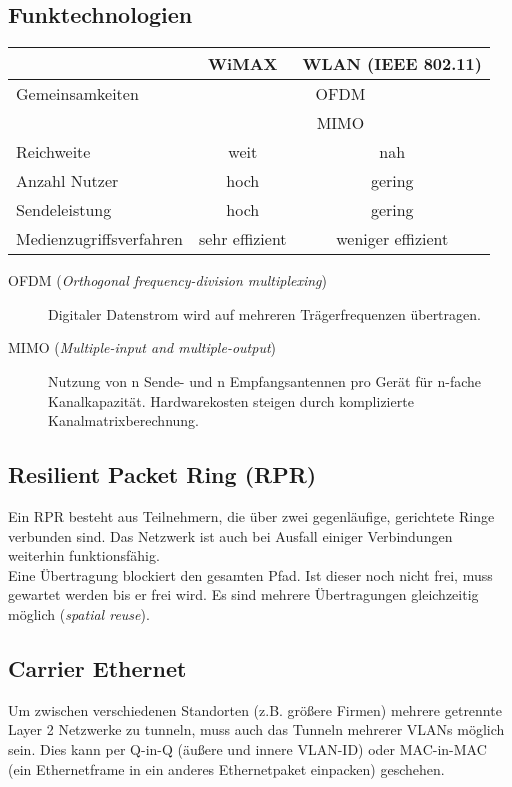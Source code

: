 \documentclass[a4paper]{article}
\begin{document}
\subsection{Funktechnologien}
\begin{tabular}{l|c|c}
    & WiMAX & WLAN (IEEE 802.11) \\ \hline
    Gemeinsamkeiten & \multicolumn{2}{c}{OFDM} \\
    & \multicolumn{2}{c}{MIMO} \\ \hline
    Reichweite & weit & nah \\
    Anzahl Nutzer & hoch & gering \\
    Sendeleistung & hoch & gering \\
    Medienzugriffsverfahren & sehr effizient & weniger effizient
\end{tabular}

\begin{description}
    \item[OFDM (\textit{Orthogonal frequency-division multiplexing})] Digitaler Datenstrom wird auf mehreren Trägerfrequenzen übertragen.
    \item[MIMO (\textit{Multiple-input and multiple-output})] Nutzung von n Sende- und n Empfangsantennen pro Gerät für n-fache Kanalkapazität. Hardwarekosten steigen durch komplizierte Kanalmatrixberechnung.
\end{description}

\subsection{Resilient Packet Ring (RPR)}
Ein RPR besteht aus Teilnehmern, die über zwei gegenläufige, gerichtete Ringe verbunden sind. Das Netzwerk ist auch bei Ausfall einiger Verbindungen weiterhin funktionsfähig.
\bigskip \\
Eine Übertragung blockiert den gesamten Pfad. Ist dieser noch nicht frei, muss gewartet werden bis er frei wird. Es sind mehrere Übertragungen gleichzeitig möglich (\textit{spatial reuse}).

\subsection{Carrier Ethernet}
Um zwischen verschiedenen Standorten (z.B. größere Firmen) mehrere getrennte Layer 2 Netzwerke zu tunneln, muss auch das Tunneln mehrerer VLANs möglich sein. Dies kann per Q-in-Q (äußere und innere VLAN-ID) oder MAC-in-MAC (ein Ethernetframe in ein anderes Ethernetpaket einpacken) geschehen.
\end{document}
